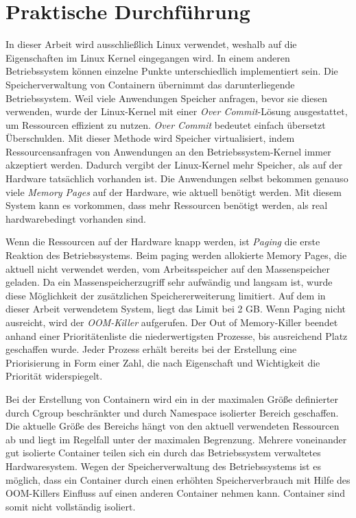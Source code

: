 \thispagestyle{empty}
\section{Praktische Durchführung}
\label{Isolation Container}

In dieser Arbeit wird ausschließlich Linux verwendet, weshalb auf die Eigenschaften im Linux Kernel eingegangen wird. In einem anderen Betriebssystem können einzelne Punkte unterschiedlich implementiert sein. Die Speicherverwaltung von Containern übernimmt das darunterliegende Betriebssystem. Weil viele Anwendungen Speicher anfragen, bevor sie diesen verwenden, wurde der Linux-Kernel mit einer \emph{Over Commit}-Lösung ausgestattet, um Ressourcen effizient zu nutzen. \emph{Over Commit} bedeutet einfach übersetzt Überschulden. Mit dieser Methode wird Speicher virtualisiert, indem Ressourcensanfragen von Anwendungen an den Betriebssystem-Kernel immer akzeptiert werden. Dadurch vergibt der Linux-Kernel mehr Speicher, als auf der Hardware tatsächlich vorhanden ist. Die Anwendungen selbst bekommen genauso viele \emph{Memory Pages} auf der Hardware, wie aktuell benötigt werden. Mit diesem System kann es vorkommen, dass mehr Ressourcen benötigt werden, als real hardwarebedingt vorhanden sind. 

Wenn die Ressourcen auf der Hardware knapp werden, ist \emph{Paging} die erste Reaktion des Betriebssystems. Beim paging werden allokierte Memory Pages, die aktuell nicht verwendet werden, vom Arbeitsspeicher auf den Massenspeicher geladen. Da ein Massenspeicherzugriff sehr aufwändig und langsam ist, wurde diese Möglichkeit der zusätzlichen Speichererweiterung limitiert. Auf dem in dieser Arbeit verwendetem System, liegt das Limit bei 2 GB. Wenn Paging nicht ausreicht, wird der \emph{OOM-Killer} aufgerufen. Der Out of Memory-Killer beendet anhand einer Prioritätenliste die niederwertigsten Prozesse, bis ausreichend Platz geschaffen wurde. Jeder Prozess erhält bereits bei der Erstellung eine Priorisierung in Form einer Zahl, die nach Eigenschaft und Wichtigkeit die Priorität widerspiegelt.

Bei der Erstellung von Containern wird ein in der maximalen Größe definierter durch Cgroup beschränkter und durch Namespace isolierter Bereich geschaffen. Die aktuelle Größe des Bereichs hängt von den aktuell verwendeten Ressourcen ab und liegt im Regelfall unter der maximalen Begrenzung. Mehrere voneinander gut isolierte Container teilen sich ein durch das Betriebssystem verwaltetes Hardwaresystem. Wegen der Speicherverwaltung des Betriebssystems ist es möglich, dass ein Container durch einen erhöhten Speicherverbrauch mit Hilfe des OOM-Killers Einfluss auf einen anderen Container nehmen kann. Container sind somit nicht vollständig isoliert.

